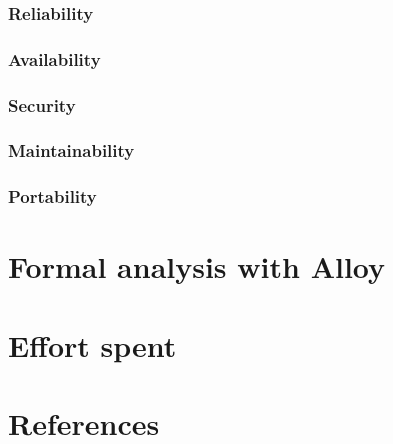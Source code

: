\documentclass[12pt, a4paper]{report}
\begin{document}
        \subsection{Reliability}
        \subsection{Availability}
        \subsection{Security}
        \subsection{Maintainability}
        \subsection{Portability}

\newpage 

\chapter{Formal analysis with Alloy}

\newpage 

\chapter{Effort spent}

\newpage 

\chapter{References}
\end{document}
